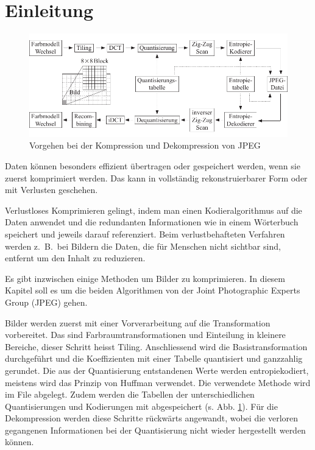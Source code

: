%
%
%
%
\section{Einleitung\label{jpeg:section:einleitung}}
\begin{figure}
    \centering
    \includegraphics[width=\linewidth]{papers/jpeg/pictures/kompressionsschema.pdf}
    \caption{Vorgehen bei der Kompression und Dekompression von JPEG
        \label{jpeg:fig:kompressionsschema}}
\end{figure}
Daten können besonders effizient übertragen oder gespeichert werden, wenn sie zuerst komprimiert werden.
Das kann in vollständig rekonstruierbarer Form oder mit Verlusten geschehen.

Verlustloses Komprimieren gelingt, indem man einen Kodieralgorithmus auf die Daten anwendet und die redundanten Informationen wie in einem Wörterbuch speichert und jeweils darauf referenziert. Beim verlustbehafteten Verfahren werden z.~B.~bei Bildern die Daten, die für Menschen nicht sichtbar sind, entfernt um den Inhalt zu reduzieren.

Es gibt inzwischen einige Methoden um Bilder zu komprimieren.
In diesem Kapitel soll es um die beiden Algorithmen von der Joint Photographic Experts Group (JPEG) gehen.
%
%


Bilder werden zuerst mit einer Vorverarbeitung auf die Transformation vorbereitet.
Das sind Farb\-raum\-trans\-formationen und Einteilung in kleinere Bereiche, dieser Schritt heisst Tiling.
An\-schlies\-send wird die Basistransformation durchgeführt und die Koeffizienten mit einer Tabelle quantisiert und ganzzahlig gerundet.
Die aus der Quantisierung entstandenen Werte werden entropiekodiert, meistens wird das Prinzip von Huffman verwendet.
Die verwendete Methode wird im File abgelegt.
Zudem werden die Tabellen der unterschiedlichen Quantisierungen und Kodierungen mit abgespeichert (s. Abb. \ref{jpeg:fig:kompressionsschema}).
Für die Dekompression werden diese Schritte rückwärts angewandt, wobei die verloren gegangenen Informationen bei der Quantisierung nicht wieder hergestellt werden können. 

